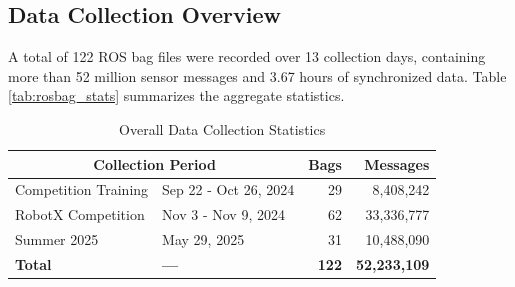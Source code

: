 \documentclass{erauthesis}
\begin{document}
\subsection{Data Collection Overview}
\label{sec:data_overview}

A total of 122 ROS bag files were recorded over 13 collection days, 
containing more than 52 million sensor messages and 3.67 hours of synchronized data.  
Table \ref{tab:rosbag_stats} summarizes the aggregate statistics.  


\begin{table}[h]
\centering
\caption{Overall Data Collection Statistics}
\label{tab:rosbag_stats}
\begin{tabular}{llrr}
\hline
\multicolumn{2}{c}{Collection Period} & Bags & Messages \\
\hline
\hline
Competition Training & Sep 22 - Oct 26, 2024 & 29 & 8,408,242 \\
RobotX Competition & Nov 3 - Nov 9, 2024 & 62 & 33,336,777 \\
Summer 2025  & May 29, 2025 & 31 & 10,488,090 \\
\hline
\textbf{Total} & \textbf{---} & \textbf{122} & \textbf{52,233,109} \\
\hline
\end{tabular}
\label{tab:collection_periods}
\end{table}
\end{document}
